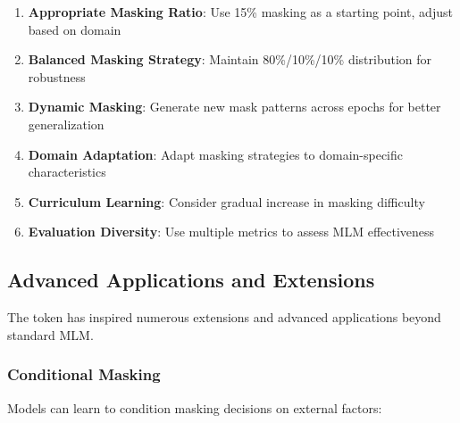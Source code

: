 \begin{enumerate}
\item \textbf{Appropriate Masking Ratio}: Use 15\% masking as a starting point, adjust based on domain
\item \textbf{Balanced Masking Strategy}: Maintain 80\%/10\%/10\% distribution for robustness
\item \textbf{Dynamic Masking}: Generate new mask patterns across epochs for better generalization
\item \textbf{Domain Adaptation}: Adapt masking strategies to domain-specific characteristics
\item \textbf{Curriculum Learning}: Consider gradual increase in masking difficulty
\item \textbf{Evaluation Diversity}: Use multiple metrics to assess MLM effectiveness
\end{enumerate}

\subsection{Advanced Applications and Extensions}

The \mask{} token has inspired numerous extensions and advanced applications beyond standard MLM.

\subsubsection{Conditional Masking}

Models can learn to condition masking decisions on external factors:

